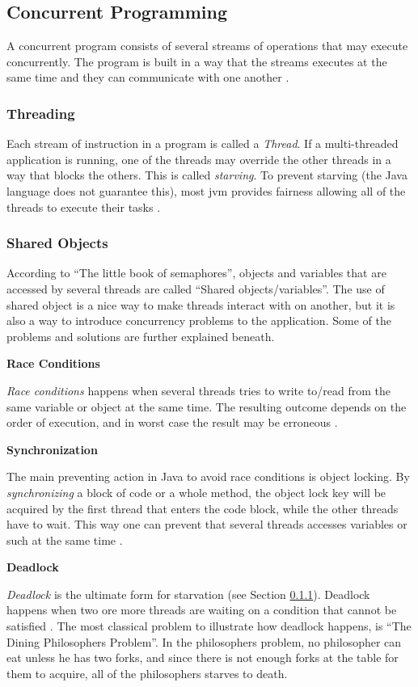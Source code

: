 \subsection{Concurrent Programming}
\label{sec:concurrentprog}
A concurrent program consists of several streams of operations that may execute concurrently. The program is built in a way that the streams executes at the same time and they can communicate with one another \cite{cartwright2000}.

\subsubsection{Threading}
\label{sec:threading}
Each stream of instruction in a program is called a \textit{Thread}. If a multi-threaded application is running, one of the threads may override the other threads in a way that blocks the others. This is called \textit{starving}. To prevent starving (the Java language does not guarantee this), most \acrshort{jvm} provides fairness allowing all of the threads to execute their tasks \cite{cartwright2000}.

\subsubsection{Shared Objects}
\label{sec:sharedobj}
According to ``The little book of semaphores''\cite{downey2008}, objects and variables that are accessed by several threads are called ``Shared objects/variables''. The use of shared object is a nice way to make threads interact with on another, but it is also a way to introduce concurrency problems to the application. Some of the problems and solutions are further explained beneath.

\textbf{Race Conditions}
\label{sec:raisedcond}

\textit{Race conditions} happens when several threads tries to write to/read from the same variable or object at the same time. The resulting outcome depends on the order of execution, and in worst case the result may be erroneous \cite{stevecarr2003}. 

\textbf{Synchronization}
\label{sec:synchronization}

The main preventing action in Java to avoid race conditions is object locking. By \textit{synchronizing} a block of code or a whole method, the object lock key will be acquired by the first thread that enters the code block, while the other threads have to wait. This way one can prevent that several threads accesses variables or such at the same time \cite{cartwright2000}.

\textbf{Deadlock}
\label{sec:deadlock}

\textit{Deadlock} is the ultimate form for starvation (see Section \ref{sec:threading}). Deadlock happens when two ore more threads are waiting on a condition that cannot be satisfied \cite{sunmicrosystems2005}. The most classical problem to illustrate how deadlock happens, is ``The Dining Philosophers Problem''\cite{cartwright2000v2}. In the philosophers problem, no philosopher can eat unless he has two forks, and since there is not enough forks at the table for them to acquire, all of the philosophers starves to death.